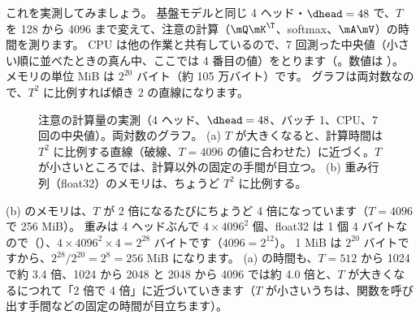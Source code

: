 これを実測してみましょう。
基盤モデルと同じ 4 ヘッド・$\dhead=48$ で、$T$ を 128 から 4096 まで変えて、注意の計算（$\mQ\mK^\T$、softmax、$\mA\mV$）の時間を測ります。
CPU は他の作業と共有しているので、7 回測った中央値（小さい順に並べたときの真ん中、ここでは 4 番目の値）をとります（。数値は ）。
メモリの単位 MiB は $2^{20}$ バイト（約 105 万バイト）です。
グラフは両対数なので、$T^2$ に比例すれば傾き 2 の直線になります。

\begin{figure}[tbp]
\centering
{}
\caption{注意の計算量の実測（4 ヘッド、$\dhead=48$、バッチ 1、CPU、7 回の中央値）。両対数のグラフ。
(a) $T$ が大きくなると、計算時間は $T^2$ に比例する直線（破線、$T=4096$ の値に合わせた）に近づく。$T$ が小さいところでは、計算以外の固定の手間が目立つ。
(b) 重み行列（float32）のメモリは、ちょうど $T^2$ に比例する。}
\label{fig:attn-cost}
\end{figure}

(b) のメモリは、$T$ が 2 倍になるたびにちょうど 4 倍になっています（$T=4096$ で 256 MiB）。
重みは 4 ヘッドぶんで $4\times4096^2$ 個、float32 は 1 個 4 バイトなので（）、$4\times4096^2\times4=2^{28}$ バイトです（$4096=2^{12}$）。
1 MiB は $2^{20}$ バイトですから、$2^{28}/2^{20}=2^{8}=256$ MiB になります。
(a) の時間も、$T=512$ から 1024 で約 3.4 倍、1024 から 2048 と 2048 から 4096 では約 4.0 倍と、$T$ が大きくなるにつれて「2 倍で 4 倍」に近づいていきます（$T$ が小さいうちは、関数を呼び出す手間などの固定の時間が目立ちます）。


